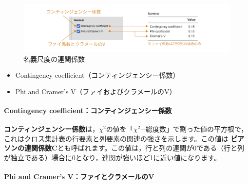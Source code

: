 \documentclass[
  12pt,
  a5jpaper,
  lualatex, ja=standard]{bxjsbook}
\providecommand{\tightlist}{%
  \setlength{\itemsep}{0pt}\setlength{\parskip}{0pt}}
\renewcommand{\emph}[1]{\textbf{\color{emph} #1}}
\newenvironment{jmvsettings}{%
	\begin{center}%
	\begin{tcolorbox}[%
		title=設定項目,
		colframe=gmoji,
		colbacktitle=gmoji,
		colback=gmoji!2!white,
		breakable,
		width=.9\textwidth,
		]\small\addtolength{\leftmargini}{-3\labelsep}%
	}%
	{\end{tcolorbox}\end{center}}
\begin{document}
\begin{figure}[!ht]

{\centering \includegraphics[width=1\linewidth]{images/frequencies/chisq-contingency} 

}

\caption{名義尺度の連関係数}\label{fig:frequencies-chisq-contingency}
\end{figure}

\begin{jmvsettings}

\begin{itemize}
\tightlist
\item
  Contingency coefficient（コンティンジェンシー係数）
\item
  Phi and Cramer's V（ファイおよびクラメールのV）
\end{itemize}

\end{jmvsettings}

\hypertarget{contingency-coefficientux30b3ux30f3ux30c6ux30a3ux30f3ux30b8ux30a7ux30f3ux30b7ux30fcux4fc2ux6570}{%
\paragraph*{Contingency coefficient：コンティンジェンシー係数}\label{contingency-coefficientux30b3ux30f3ux30c6ux30a3ux30f3ux30b8ux30a7ux30f3ux30b7ux30fcux4fc2ux6570}}

\emph{コンティンジェンシー係数}は，\(\chi^2\)の値を「\(\chi^2\)+総度数」で割った値の平方根で，これはクロス集計表の行要素と列要素の関連の強さを示します。この値は\emph{ピアソンの連関係数C}とも呼ばれます。この値は，行と列の連関が0である（行と列が独立である）場合に0となり，連関が強いほど1に近い値になります。

\hypertarget{phi-and-cramers-vux30d5ux30a1ux30a4ux3068ux30afux30e9ux30e1ux30fcux30ebux306ev}{%
\paragraph*{Phi and Cramer's V：ファイとクラメールのV}\label{phi-and-cramers-vux30d5ux30a1ux30a4ux3068ux30afux30e9ux30e1ux30fcux30ebux306ev}}
\end{document}
